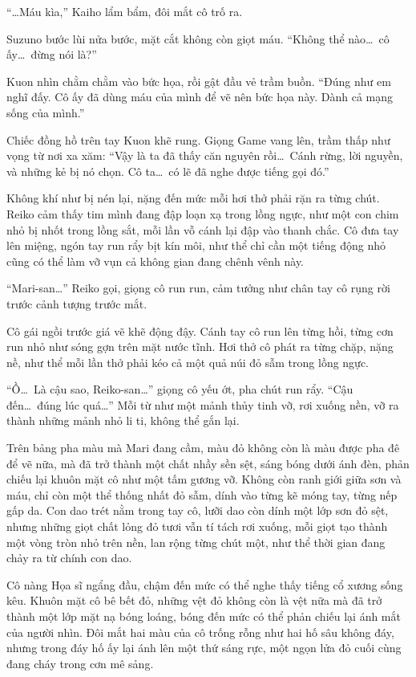 \documentclass[../main.tex]{subfiles}
\begin{document}

``\dots Máu kìa,'' Kaiho lẩm bẩm, đôi mắt cô trố ra.

Suzuno bước lùi nửa bước, mặt cắt không còn giọt máu. ``Không thể nào\dots\ cô ấy\dots\ đừng nói là?''

Kuon nhìn chằm chằm vào bức họa, rồi gật đầu vẻ trầm buồn. ``Đúng như em nghĩ đấy. Cô ấy đã dùng máu của mình để vẽ nên bức họa này. Dành cả mạng sống của mình.''

Chiếc đồng hồ trên tay Kuon khẽ rung. Giọng Game vang lên, trầm thấp như vọng từ nơi xa xăm: ``Vậy là ta đã thấy căn nguyên rồi\dots\ Cánh rừng, lời nguyền, và những kẻ bị nó chọn. Cô ta\dots\ có lẽ đã nghe được tiếng gọi đó.''

Không khí như bị nén lại, nặng đến mức mỗi hơi thở phải rặn ra từng chút. Reiko cảm thấy tim mình đang đập loạn xạ trong lồng ngực, như một con chim nhỏ bị nhốt trong lồng sắt, mỗi lần vỗ cánh lại đập vào thanh chắc. Cô đưa tay lên miệng, ngón tay run rẩy bịt kín môi, như thể chỉ cần một tiếng động nhỏ cũng có thể làm vỡ vụn cả không gian đang chênh vênh này.

``Mari-san\dots'' Reiko gọi, giọng cô run run, cảm tưởng như chân tay cô rụng rời trước cảnh tượng trước mắt.

Cô gái ngồi trước giá vẽ khẽ động đậy. Cánh tay cô run lên từng hồi, từng cơn run nhỏ như sóng gợn trên mặt nước tĩnh. Hơi thở cô phát ra từng chặp, nặng nề, như thể mỗi lần thở phải kéo cả một quả núi đỏ sẫm trong lồng ngực.

``Ồ\dots\ Là cậu sao, Reiko-san\dots'' giọng cô yếu ớt, pha chút run rẩy. ``Cậu đến\dots\ đúng lúc quá\dots'' Mỗi từ như một mảnh thủy tinh vỡ, rơi xuống nền, vỡ ra thành những mảnh nhỏ li ti, không thể gắn lại.

Trên bảng pha màu mà Mari đang cầm, màu đỏ không còn là màu được pha đê để vẽ nữa, mà đã trở thành một chất nhầy sền sệt, sáng bóng dưới ánh đèn, phản chiếu lại khuôn mặt cô như một tấm gương vỡ. Không còn ranh giới giữa sơn và máu, chỉ còn một thể thống nhất đỏ sẫm, dính vào từng kẽ móng tay, từng nếp gấp da. Con dao trét nằm trong tay cô, lưỡi dao còn dính một lớp sơn đỏ sệt, nhưng những giọt chất lỏng đỏ tươi vẫn tí tách rơi xuống, mỗi giọt tạo thành một vòng tròn nhỏ trên nền, lan rộng từng chút một, như thể thời gian đang chảy ra từ chính con dao.

Cô nàng Họa sĩ ngẩng đầu, chậm đến mức có thể nghe thấy tiếng cổ xương sống kêu. Khuôn mặt cô bê bết đỏ, những vệt đỏ không còn là vệt nữa mà đã trở thành một lớp mặt nạ bóng loáng, bóng đến mức có thể phản chiếu lại ánh mắt của người nhìn. Đôi mắt hai màu của cô trống rỗng như hai hố sâu không đáy, nhưng trong đáy hố ấy lại ánh lên một thứ sáng rực, một ngọn lửa đỏ cuối cùng đang cháy trong cơn mê sảng.
\end{document}
